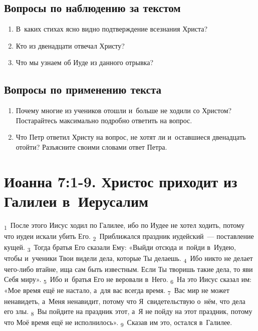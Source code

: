 \documentclass[a4paper,12pt]{article}
\begin{document}
\subsection*{Вопросы по наблюдению за текстом}
\begin{enumerate}
    \item В~каких стихах ясно видно подтверждение всезнания Христа? 
    
    \myline
    
    \item Кто из двенадцати отвечал Христу? 
    
    \myline
    
    \item Что мы узнаем об Иуде из данного отрывка? 
    
    \myline
    
    \myline
\end{enumerate}

\subsection*{Вопросы по применению текста} 
\begin{enumerate}
    \item Почему многие из учеников отошли и~больше не ходили со Христом? Постарайтесь максимально подробно ответить на вопрос. 
    
    \myline
    
    \myline
    \item Что Петр ответил Христу на вопрос, не хотят ли и~оставшиеся двенадцать отойти? Разъясните своими словами ответ Петра. 
    
    \myline
    
    \myline
\end{enumerate}



\section{Иоанна 7:1-9. Христос приходит из Галилеи в~Иерусалим}


\textsubscript{1}~После этого Иисус ходил по Галилее, ибо по Иудее не хотел ходить, потому что иудеи искали убить Его.
\textsubscript{2}~Приближался праздник иудейский~--- поставление кущей.
\textsubscript{3}~Тогда братья Его сказали Ему: «Выйди отсюда и~пойди в~Иудею, чтобы и~ученики Твои видели дела, которые Ты делаешь.
\textsubscript{4}~Ибо никто не делает чего-либо втайне, ища сам быть известным. Если Ты творишь такие дела, то яви Себя миру».
\textsubscript{5}~Ибо и~братья Его не веровали в~Него.
\textsubscript{6}~На это Иисус сказал им: «Мое время ещё не настало, а~для вас всегда время.
\textsubscript{7}~Вас мир не может ненавидеть, а~Меня ненавидит, потому что Я~свидетельствую о~нём, что дела его злы.
\textsubscript{8}~Вы пойдите на праздник этот, а~Я не пойду на этот праздник, потому что Моё время ещё не исполнилось».
\textsubscript{9}~Сказав им это, остался в~Галилее.
\end{document}
